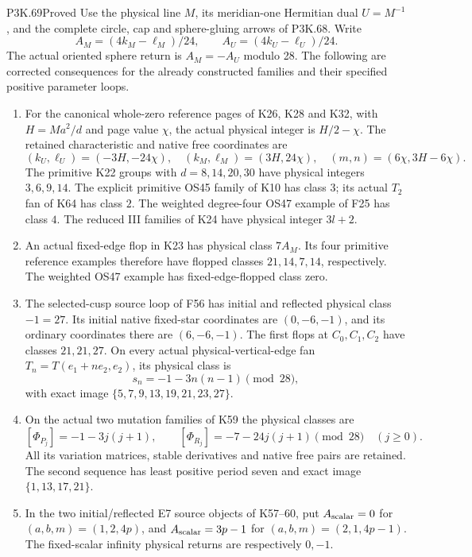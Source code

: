 \begin{statement}{P3K.69}{Proved}
Use the physical line \(M\), its meridian-one Hermitian dual
\(U=M^{-1}\), and the complete circle, cap and sphere-gluing arrows
of P3K.68. Write
\[
 A_M=(4k_M-\ell_M)/24,\qquad A_U=(4k_U-\ell_U)/24.
\]
The actual oriented sphere return is \(A_M=-A_U\) modulo 28.
The following are corrected consequences for the already constructed
families and their specified positive parameter loops.

\begin{enumerate}
\item For the canonical whole-zero reference pages of K26, K28 and
K32, with \(H=Ma^2/d\) and page value \(\chi\), the actual physical
integer is \(H/2-\chi\). The retained characteristic and native free
coordinates are
\[
 (k_U,\ell_U)=(-3H,-24\chi),\quad
 (k_M,\ell_M)=(3H,24\chi),\quad
 (m,n)=(6\chi,3H-6\chi).
\]
The primitive K22 groups with \(d=8,14,20,30\) have physical integers
\(3,6,9,14\). The explicit primitive OS45 family of K10 has class
\(3\); its actual \(T_2\) fan of K64 has class \(2\).
The weighted degree-four OS47 example of F25 has class \(4\).
The reduced III families of K24 have physical integer \(3l+2\).
\item An actual fixed-edge flop in K23 has physical class
\(7A_M\). Its four primitive reference examples therefore have
flopped classes \(21,14,7,14\), respectively. The weighted OS47
example has fixed-edge-flopped class zero.
\item The selected-cusp source loop of F56 has initial and reflected
physical class \(-1=27\). Its initial native fixed-star coordinates
are \((0,-6,-1)\), and its ordinary coordinates there are
\((6,-6,-1)\). The first flops at \(C_0,C_1,C_2\) have classes
\(21,21,27\). On every actual physical-vertical-edge fan
\(T_n=T(e_1+ne_2,e_2)\), its physical class is
\[
                  s_n=-1-3n(n-1)\pmod{28},
\]
with exact image \(\{5,7,9,13,19,21,23,27\}\).
\item On the actual two mutation families of K59 the physical classes
are
\[
 [\Phi_{P_j}]=-1-3j(j+1),\qquad
 [\Phi_{R_j}]=-7-24j(j+1)\pmod{28}\quad(j\geq0).
\]
All its variation matrices, stable derivatives and native free pairs
are retained. The second sequence has least positive period seven
and exact image \(\{1,13,17,21\}\).
\item In the two initial/reflected E7 source objects of K57--60, put
\(A_{\rm scalar}=0\) for \((a,b,m)=(1,2,4p)\), and
\(A_{\rm scalar}=3p-1\) for \((a,b,m)=(2,1,4p-1)\).
The fixed-scalar infinity physical returns are respectively \(0,-1\).

\end{enumerate}
\end{statement}
